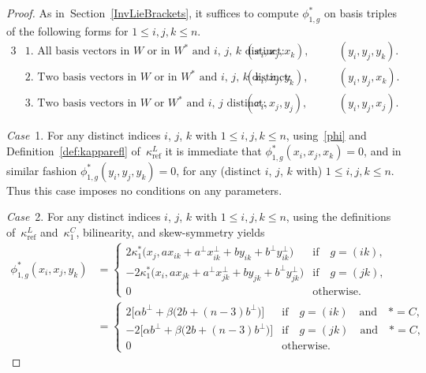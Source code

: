 \documentclass[10pt,a4paper]{amsart}
\numberwithin{equation}{section}
\DeclareMathOperator{\refl}{ref}
\begin{document}
\begin{proof}
As in~Section~\ref{InvLieBrackets}, it suffices to compute $\phi^*_{1,g}$ on basis triples
of the following forms for $1 \leq i, j, k \leq n$.
\begin{alignat*}{3}
&\text{1.\ All basis vectors in $W$ or in $W^*$ and $i$, $j$, $k$ distinct:} &\hspace{10pt}
& (x_i,x_j,x_k), & &\quad (y_i,y_j,y_k). \\
&\text{2.\ Two basis vectors in $W$ or in $W^*$ and $i$, $j$, $k$ distinct:} &\hspace{10pt}
& (x_i,x_j,y_k), & &\quad (y_i,y_j,x_k). \\
&\text{3.\ Two basis vectors in $W$ or $W^*$ and $i$, $j$ distinct:} &\hspace{10pt}
& (x_i,x_j,y_j), & &\quad (y_i,y_j,x_j).
\end{alignat*}

\textit{Case}~1.
For any distinct indices $i$, $j$, $k$ with $1 \leq i, j, k \leq n$, using~\eqref{phi} and
Definition~\ref{def:kapparefl} of~$\kappa^L_{\refl}$ it is immediate
that $\phi^*_{1,g}(x_i,x_j,x_k)=0$, and in similar fashion $\phi^*_{1,g}(y_i,y_j,y_k)=0$,
for any (distinct $i$, $j$, $k$ with) $1 \leq i, j, k \leq n$.
Thus this case imposes no conditions on any parameters.

\textit{Case}~2.
For any distinct indices $i$, $j$, $k$ with $1 \leq i, j, k \leq n$,
using the definitions of~$\kappa^L_{\refl}$ and~$\kappa^C_1$, bilinearity,
and skew-symmetry yields
\begin{align*}
\phi^*_{1,g}(x_i,x_j,y_k)%
&=\begin{cases}
2\kappa^*_1\big(x_j,ax_{ik}+a^\perp x_{ik}^\perp + b y_{ik} + b^\perp y_{ik}^\perp\big) &\text{if}\quad g=(ik),
\\
-2\kappa^*_1\big(x_i,ax_{jk}+a^\perp x_{jk}^\perp + b y_{jk} + b^\perp y_{jk}^\perp\big) &\text{if}\quad g=(jk), \\
0 & \text{otherwise}.
\end{cases}
\\
&=\begin{cases}
2\big[\alpha b^\perp + \beta\big(2b+(n-3)b^\perp\big)\big] & \text{if}\quad g=(ik)\quad \text{and}\quad *=C, \\
-2\big[\alpha b^\perp + \beta\big(2b+(n-3)b^\perp\big)\big] &\text{if}\quad g=(jk) \quad \text{and}\quad *=C, \\
 0 & \text{otherwise}.
\end{cases}
\end{align*}


\end{proof}
\end{document}
